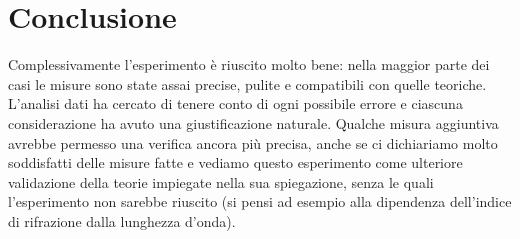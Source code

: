\documentclass[a4paper,11pt]{article}
\begin{document}
\section{Conclusione}
	Complessivamente l'esperimento è riuscito molto bene: nella maggior parte dei casi le misure sono state assai precise, pulite e compatibili con quelle teoriche. L'analisi dati ha cercato di tenere conto di ogni possibile errore e ciascuna considerazione ha avuto una giustificazione naturale. Qualche misura aggiuntiva avrebbe permesso una verifica ancora più precisa, anche se ci dichiariamo molto soddisfatti delle misure fatte e vediamo questo esperimento come ulteriore validazione della teorie impiegate nella sua spiegazione, senza le quali l'esperimento non sarebbe riuscito (si pensi ad esempio alla dipendenza dell'indice di rifrazione dalla lunghezza d'onda).
\end{document}
